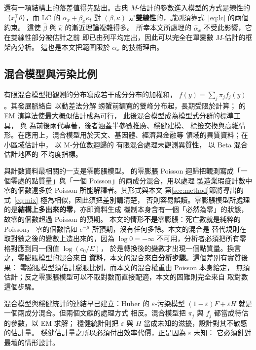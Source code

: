 \documentclass[UTF8, fontset=macnew, a4paper, 12pt]{ctexart}
\begin{document}
還有一項結構上的落差值得先點出。古典 $M$-估計的參數進入模型的方式是線性的
（$x_i^{\top}\theta$），而 LC 的 $\alpha_x+\beta_x\kappa_t$ 對
$(\beta,\kappa)$ 是\textbf{雙線性}的，識別須靠式~\eqref{eq:lc} 的兩個約束。
這使 $\hat\beta$ 與 $\hat\kappa$ 的漸近理論複雜得多。
所幸本文所處理的 $\hat\alpha_x$ 不受此影響，它在雙線性部分被估計之前
即已由列平均定出，因此可以完全在單變數 $M$-估計的框架內分析。
這也是本文把範圍限於 $\alpha_x$ 的技術理由。

\subsection{混合模型與污染比例}

有限混合模型把觀測的分布寫成若干成分分布的加權和，
$f(y)=\sum_{j}\pi_j f_j(y)$。其發展脈絡自 \citet{pearson1894} 以動差法分解
螃蟹前額寬的雙峰分布起，長期受限於計算；
\citet{dempster1977} 的 EM 演算法使最大概似估計成為可行，
此後混合模型成為模型式分群的標準工具，\citet{mclachlan2000} 與
\citet{yao2024} 為前後兩代專著，後者涵蓋半參數推廣、穩健建模、
標籤交換與高維情形。在應用上，混合模型用於天文、基因體、經濟與金融等
領域的異質資料；在小區域估計中，\citet{delsarto2019} 以 M-分位數迴歸的
有限混合處理未觀測異質性，\citet{denicolo2023} 以 Beta 混合估計地區的
不均度指標。

與計數資料最相關的一支是零膨脹模型。\citet{lambert1992} 的零膨脹 Poisson
迴歸把觀測寫成「一個零處的點質量」與「一個 Poisson」的兩成分混合，用以處理
製造業瑕疵計數中零的個數遠多於 Poisson 所能解釋者。其形式與本文
第\ref{sec:method}節將導出的式~\eqref{eq:mix} 極為相似，因此須把差別講清楚，
否則容易誤讀。零膨脹模型所處理的是\textbf{結構上多出來的零}，亦即資料生成
機制本身含有一個「必然為零」的狀態，故零的個數超過 Poisson 的預期。
本文的情形\textbf{不是}零膨脹：死亡數就是純粹的 Poisson，
零的個數恰如 $e^{-\mu}$ 所預期，沒有任何多餘。本文的混合是
替代規則在取對數之後的變數上造出來的，因為 $\log 0=-\infty$
不可用，分析者必須把所有零格對應到同一個值 $\log(c_0/E)$，
於是轉換後的變數才出現一個點質量。換言之，零膨脹模型的混合來自
\textbf{資料}，本文的混合來自\textbf{分析步驟}。這個差別有實質後果：
零膨脹模型須估計膨脹比例，而本文的混合權重由 Poisson 本身給定，
無須估計；反之零膨脹模型可以不取對數而直接配適，本文的困難則完全來自
取對數這個步驟。

混合模型與穩健統計的連結早已建立：Huber 的 $\varepsilon$-污染模型
$(1-\varepsilon)F+\varepsilon H$ 就是一個兩成分混合。但兩個文獻的處理方式
相反。混合模型把 $\pi_j$ 與 $f_j$ 都當成待估的參數，以 EM 求解；
穩健統計則把 $\varepsilon$ 與 $H$ 當成未知的滋擾，設計對其不敏感的估計量。
穩健估計量之所以必須付出效率代價，正是因為 $\varepsilon$ 未知：
它必須針對最壞的情形設計。
\end{document}
